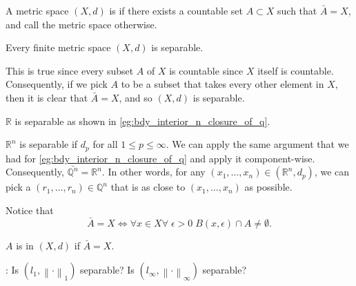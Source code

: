 \documentclass[notoc,notitlepage]{tufte-book}
\newcommand{\norm}[1]{\left\| #1 \right\|}
\begin{document}
\begin{defn}[Separable]\label{defn:separable}
  A metric space $(X, d)$ is  if there exists a countable set $A \subset X$ such that $\bar{A} = X$, and call the metric space  otherwise.
\end{defn}

\begin{eg}
  Every finite metric space $(X, d)$ is separable.

  This is true since every subset $A$ of $X$ is countable since $X$ itself is countable. Consequently, if we pick $A$ to be a subset that takes every other element in $X$, then it is clear that $\bar{A} = X$, and so $(X, d)$ is separable.
\end{eg}

\begin{eg}
  $\mathbb{R}$ is separable as shown in \cref{eg:bdy_interior_n_closure_of_q}.
\end{eg}

\begin{eg}
  $\mathbb{R}^n$ is separable if $d_p$ for all $1 \leq p \leq \infty$. We can apply the same argument that we had for \cref{eg:bdy_interior_n_closure_of_q} and apply it component-wise. Consequently, $\bar{\mathbb{Q}^n} = \mathbb{R}^n$. In other words, for any $(x_1, \ldots, x_n) \in (\mathbb{R}^n, d_p)$, we can pick a $(r_1, \ldots, r_n) \in \mathbb{Q}^n$ that is as close to $(x_1, \ldots, x_n)$ as possible.
\end{eg}

\begin{remark}
  Notice that
  \begin{equation*}
    \bar{A} = X \iff \forall x \in X \forall \; \epsilon > 0 \; B(x, \epsilon) \cap A \neq \emptyset.
  \end{equation*}
\end{remark}

\begin{defn}[Dense]\label{defn:dense}
  $A$ is  in $(X, d)$ if $\bar{A} = X$.
\end{defn}

: Is $(l_1, \norm\cdot_1)$ separable? Is $(l_\infty, \norm\cdot_\infty)$ separable?
\end{document}
